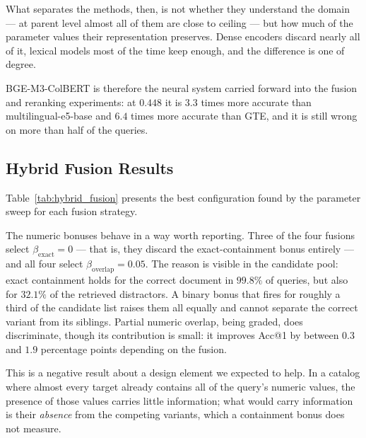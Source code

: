 \documentclass[preprint,review,12pt]{elsarticle}
\begin{document}
What separates the methods, then, is not whether they understand the domain --- at parent level almost all of them are close to ceiling --- but how much of the parameter values their representation preserves. Dense encoders discard nearly all of it, lexical models most of the time keep enough, and the difference is one of degree.

BGE-M3-ColBERT is therefore the neural system carried forward into the fusion and reranking experiments: at $0.448$ it is $3.3$ times more accurate than multilingual-e5-base and $6.4$ times more accurate than GTE, and it is still wrong on more than half of the queries.

\subsection{Hybrid Fusion Results}
\label{subsec:hybrid_results}

Table~\ref{tab:hybrid_fusion} presents the best configuration found by the parameter sweep for each fusion strategy.

The numeric bonuses behave in a way worth reporting. Three of the four fusions select $\beta_{\text{exact}}=0$ --- that is, they discard the exact-containment bonus entirely --- and all four select $\beta_{\text{overlap}}=0.05$. The reason is visible in the candidate pool: exact containment holds for the correct document in $99.8\%$ of queries, but also for $32.1\%$ of the retrieved distractors. A binary bonus that fires for roughly a third of the candidate list raises them all equally and cannot separate the correct variant from its siblings. Partial numeric overlap, being graded, does discriminate, though its contribution is small: it improves Acc@1 by between $0.3$ and $1.9$ percentage points depending on the fusion.

This is a negative result about a design element we expected to help. In a catalog where almost every target already contains all of the query's numeric values, the presence of those values carries little information; what would carry information is their \emph{absence} from the competing variants, which a containment bonus does not measure.
\end{document}
